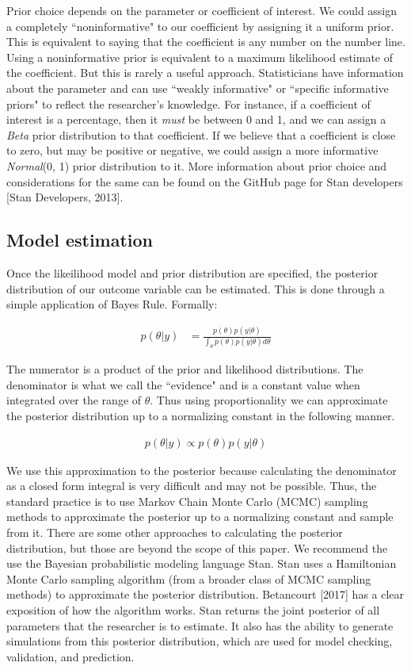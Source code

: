 \documentclass{article}
\begin{document}
Prior choice depends on the parameter or coefficient of interest.  We could assign a completely ``noninformative" to our coefficient by assigning it a uniform prior. This is equivalent to saying that the coefficient is any number on the number line. Using a noninformative prior is equivalent to a maximum likelihood estimate of the coefficient. But this is rarely a useful approach. Statisticians have information about the parameter and can use ``weakly informative" or ``specific informative priors" to reflect the researcher's knowledge. For instance, if a coefficient of interest is a percentage, then it \emph{must} be between 0 and 1, and we can assign a \emph{Beta} prior distribution to that coefficient.  If we believe that a coefficient is close to zero, but may be positive or negative, we could assign a more informative \emph{Normal}(0, 1) prior distribution to it.  More information about prior choice and considerations for the same can be found on the GitHub page for Stan developers [Stan Developers, 2013].\\


\subsection{Model estimation}
Once the likeilihood model and prior distribution are specified, the posterior distribution of our outcome variable can be estimated. This is done through a simple application of Bayes Rule. Formally:

  \begin{align*}
  p(\theta|y) &= \frac{ p(\theta) p(y |\theta)}{\int_{\theta} p(\theta) p(y |\theta) d\theta}
  \end{align*}

The numerator is a product of the prior and likelihood distributions. The denominator is what we call the ``evidence" and is a constant value when integrated over the range of $\theta$. Thus using proportionality we can approximate the posterior distribution up to a normalizing constant in the following manner.

 \begin{align*}
 p(\theta | y) \propto p(\theta) p(y |\theta)
 \end{align*}

We use this approximation to the posterior because calculating the denominator as a closed form integral is very difficult and may not be possible. Thus, the standard practice is to use Markov Chain Monte Carlo (MCMC) sampling methods to approximate the posterior up to a normalizing constant and sample from it. There are some other approaches to calculating the posterior distribution, but those are beyond the scope of this paper. We recommend the use the Bayesian probabilistic modeling language Stan. Stan uses a Hamiltonian Monte Carlo sampling algorithm (from a broader class of MCMC sampling methods) to approximate the posterior distribution. Betancourt [2017] has a clear exposition of how the algorithm works. Stan returns the joint posterior of all parameters that the researcher is to estimate. It also has the ability to generate simulations from this posterior distribution, which are used for model checking, validation, and prediction.
\end{document}
